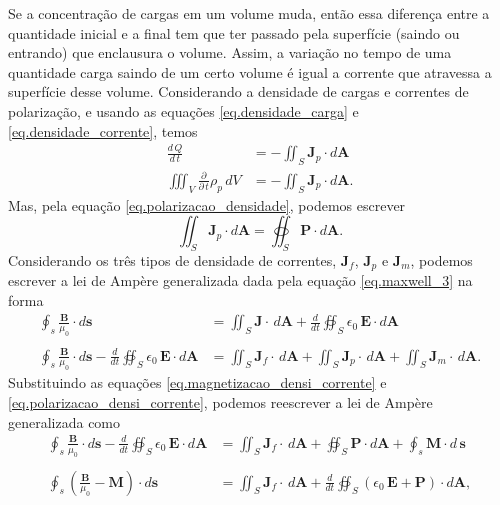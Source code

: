 Se a concentra\c{c}\~ao de cargas em um volume muda, ent\~ao essa diferen\c{c}a entre a quantidade inicial e a final tem que ter passado pela superf\'icie (saindo ou entrando) que enclausura o volume. Assim, a varia\c{c}\~ao no tempo de uma quantidade carga saindo de um certo volume \'e igual a corrente que atravessa a superf\'icie desse volume. Considerando a densidade de cargas e correntes de polariza\c{c}\~ao, e usando as equa\c{c}\~oes \ref{eq.densidade_carga} e \ref{eq.densidade_corrente}, temos
\begin{align*}
\frac{d\,Q}{d\,t}&=-\iint_S\mathbf{J}_p\cdot d\mathbf{A}\\
\iiint_V\frac{\partial}{\partial\,t}\rho_p\,dV&=-\iint_S\mathbf{J}_p\cdot d\mathbf{A}.
\end{align*}
Mas, pela equa\c{c}\~ao \ref{eq.polarizacao_densidade}, podemos escrever
\begin{equation}\label{eq.polarizacao_densi_corrente}
\iint_S\mathbf{J}_p\cdot d\mathbf{A}=\oiint_S\mathbf{P}\cdot d\mathbf{A}.
\end{equation} 
Considerando os tr\^es tipos de densidade de correntes, $\mathbf{J}_f$, $\mathbf{J}_p$ e $\mathbf{J}_m$, podemos escrever a lei de Amp\`ere generalizada dada pela equa\c{c}\~ao \ref{eq.maxwell_3} na forma
\begin{align*}
\oint_s\frac{\mathbf{B}}{\mu_0}\cdot d\mathbf{s}&=\iint_S\mathbf{J}\cdot\,d\mathbf{A}+\frac{d}{dt}\oiint_S\epsilon_0\,\textbf{E}\cdot\textit{d}\textbf{A}\\\\
\oint_s\frac{\mathbf{B}}{\mu_0}\cdot d\mathbf{s}-\frac{d}{dt}\oiint_S\epsilon_0\,\textbf{E}\cdot\textit{d}\textbf{A}&=\iint_S\mathbf{J}_f\cdot\,d\mathbf{A}+\iint_S\mathbf{J}_p\cdot\,d\mathbf{A}+\iint_S\mathbf{J}_m\cdot\,d\mathbf{A}.
\end{align*}
Substituindo as equa\c{c}\~oes \ref{eq.magnetizacao_densi_corrente} e \ref{eq.polarizacao_densi_corrente}, podemos reescrever a lei de Amp\`ere generalizada como
\begin{align*}
\oint_s\frac{\mathbf{B}}{\mu_0}\cdot d\mathbf{s}-\frac{d}{dt}\oiint_S\epsilon_0\,\textbf{E}\cdot\textit{d}\textbf{A}&=\iint_S\mathbf{J}_f\cdot\,d\mathbf{A}+\oiint_S\mathbf{P}\cdot d\mathbf{A}+\oint_s \mathbf{M}\cdot d\,\mathbf{s}\\\\
\oint_s\left(\frac{\mathbf{B}}{\mu_0}-\mathbf{M}\right)\cdot d\mathbf{s}&=\iint_S\mathbf{J}_f\cdot\,d\mathbf{A}+\frac{d}{dt}\oiint_S(\epsilon_0\,\textbf{E}+\mathbf{P})\cdot\textit{d}\textbf{A},
\end{align*}
